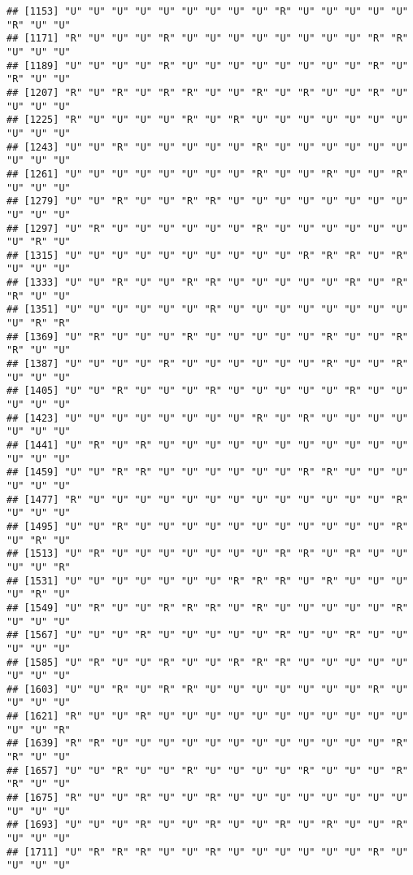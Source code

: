 \documentclass[
]{article}
\begin{document}
\begin{verbatim}
## [1153] "U" "U" "U" "U" "U" "U" "U" "U" "U" "R" "U" "U" "U" "U" "U" "R" "U" "U"
## [1171] "R" "U" "U" "U" "R" "U" "U" "U" "U" "U" "U" "U" "U" "R" "R" "U" "U" "U"
## [1189] "U" "U" "U" "U" "R" "U" "U" "U" "U" "U" "U" "U" "U" "R" "U" "R" "U" "U"
## [1207] "R" "U" "R" "U" "R" "R" "U" "U" "R" "U" "R" "U" "U" "R" "U" "U" "U" "U"
## [1225] "R" "U" "U" "U" "U" "R" "U" "R" "U" "U" "U" "U" "U" "U" "U" "U" "U" "U"
## [1243] "U" "U" "R" "U" "U" "U" "U" "U" "R" "U" "U" "U" "U" "U" "U" "U" "U" "U"
## [1261] "U" "U" "U" "U" "U" "U" "U" "U" "R" "U" "U" "R" "U" "U" "R" "U" "U" "U"
## [1279] "U" "U" "R" "U" "U" "R" "R" "U" "U" "U" "U" "U" "U" "U" "U" "U" "U" "U"
## [1297] "U" "R" "U" "U" "U" "U" "U" "U" "R" "U" "U" "U" "U" "U" "U" "U" "R" "U"
## [1315] "U" "U" "U" "U" "U" "U" "U" "U" "U" "U" "R" "R" "R" "U" "R" "U" "U" "U"
## [1333] "U" "U" "R" "U" "U" "R" "R" "U" "U" "U" "U" "U" "R" "U" "R" "R" "U" "U"
## [1351] "U" "U" "U" "U" "U" "U" "R" "U" "U" "U" "U" "U" "U" "U" "U" "U" "R" "R"
## [1369] "U" "R" "U" "U" "U" "R" "U" "U" "U" "U" "U" "R" "U" "U" "R" "R" "U" "U"
## [1387] "U" "U" "U" "U" "R" "U" "U" "U" "U" "U" "U" "R" "U" "U" "R" "U" "U" "U"
## [1405] "U" "U" "R" "U" "U" "U" "R" "U" "U" "U" "U" "U" "R" "U" "U" "U" "U" "U"
## [1423] "U" "U" "U" "U" "U" "U" "U" "U" "R" "U" "R" "U" "U" "U" "U" "U" "U" "U"
## [1441] "U" "R" "U" "R" "U" "U" "U" "U" "U" "U" "U" "U" "U" "U" "U" "U" "U" "U"
## [1459] "U" "U" "R" "R" "U" "U" "U" "U" "U" "U" "R" "R" "U" "U" "U" "U" "U" "U"
## [1477] "R" "U" "U" "U" "U" "U" "U" "U" "U" "U" "U" "U" "U" "U" "R" "U" "U" "U"
## [1495] "U" "U" "R" "U" "U" "U" "U" "U" "U" "U" "U" "U" "U" "U" "R" "U" "R" "U"
## [1513] "U" "R" "U" "U" "U" "U" "U" "U" "U" "R" "R" "U" "R" "U" "U" "U" "U" "R"
## [1531] "U" "U" "U" "U" "U" "U" "U" "R" "R" "R" "U" "R" "U" "U" "U" "U" "R" "U"
## [1549] "U" "R" "U" "U" "R" "R" "R" "U" "R" "U" "U" "U" "U" "U" "R" "U" "U" "U"
## [1567] "U" "U" "U" "R" "U" "U" "U" "U" "U" "R" "U" "U" "R" "U" "U" "U" "U" "U"
## [1585] "U" "R" "U" "U" "R" "U" "U" "R" "R" "R" "U" "U" "U" "U" "U" "U" "U" "U"
## [1603] "U" "U" "R" "U" "R" "R" "U" "U" "U" "U" "U" "U" "U" "R" "U" "U" "U" "U"
## [1621] "R" "U" "U" "R" "U" "U" "U" "U" "U" "U" "U" "U" "U" "U" "U" "U" "U" "R"
## [1639] "R" "R" "U" "U" "U" "U" "U" "U" "U" "U" "U" "U" "U" "U" "R" "R" "U" "U"
## [1657] "U" "U" "R" "U" "U" "R" "U" "U" "U" "U" "R" "U" "U" "U" "R" "R" "U" "U"
## [1675] "R" "U" "U" "R" "U" "U" "R" "U" "U" "U" "U" "U" "U" "U" "U" "U" "U" "U"
## [1693] "U" "U" "U" "R" "U" "U" "R" "U" "U" "R" "U" "R" "U" "U" "R" "U" "U" "U"
## [1711] "U" "R" "R" "R" "U" "U" "R" "U" "U" "U" "U" "U" "U" "R" "U" "U" "U" "U"

\end{verbatim}
\end{document}

